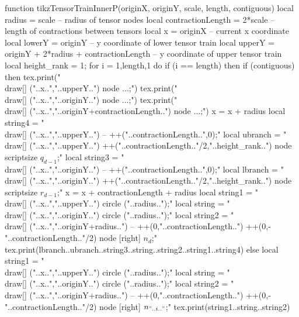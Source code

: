 \begin{luacode*}
function tikzTensorTrainInnerP(originX, originY, scale, length, contiguous)
	 local radius = scale              -- radius of tensor nodes
	 local contractionLength = 2*scale -- length of contractions between tensors
	 local x = originX										 					 			  -- current x coordinate
	 local lowerY = originY																-- y coordinate of lower tensor train
	 local upperY = originY + 2*radius + contractionLength	-- y coordinate of upper tensor train
	 local height_rank = 1;
	 for i = 1,length,1 do
			if (i == length) then
				 if (contiguous) then
						tex.print("\\draw[] ("..x..","..upperY..") node {...};")
						tex.print("\\draw[] ("..x..","..originY..") node {...};")
						tex.print("\\draw[] ("..x..","..originY+contractionLength..") node {...};")
						x = x + radius
						local string4 = "\\draw[] ("..x..","..upperY..") -- ++("..contractionLength..",0);"
						local ubranch = "\\draw[] ("..x..","..upperY..") ++("..contractionLength.."/2,"..height_rank..") node {\\scriptsize $q_{d-1}$};"
						local string3 = "\\draw[] ("..x..","..originY..") -- ++("..contractionLength..",0);"
						local lbranch = "\\draw[] ("..x..","..originY..") ++("..contractionLength.."/2,"..height_rank..") node {\\scriptsize $r_{d-1}$};"
						x = x + contractionLength + radius
						local string1 = "\\draw[] ("..x..","..upperY..") circle ("..radius..");"
						local string = "\\draw[] ("..x..","..originY..") circle ("..radius..");"
						local string2 = "\\draw[] ("..x..","..originY+radius..") -- ++(0,"..contractionLength..") ++(0,-"..contractionLength.."/2) node [right] {$n_{d}$};"
						tex.print(lbranch..ubranch..string3..string..string2..string1..string4)
				 else
						local string1 = "\\draw[] ("..x..","..upperY..") circle ("..radius..");"
						local string = "\\draw[] ("..x..","..originY..") circle ("..radius..");"
						local string2 = "\\draw[] ("..x..","..originY+radius..") -- ++(0,"..contractionLength..") ++(0,-"..contractionLength.."/2) node [right] {$n_{"..i.."}$};"
						tex.print(string1..string..string2)

\end{luacode*}
